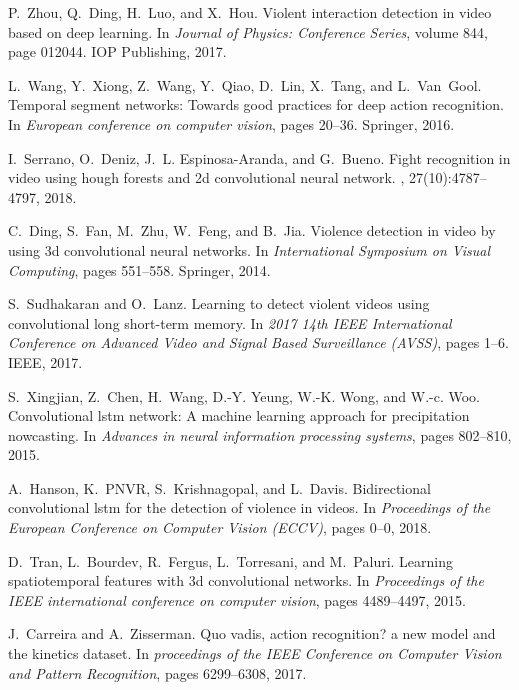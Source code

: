 \documentclass[10pt,twocolumn,letterpaper]{article}
\begin{document}
{\begin{thebibliography}{10}
P.~Zhou, Q.~Ding, H.~Luo, and X.~Hou.
\newblock Violent interaction detection in video based on deep learning.
\newblock In {\em Journal of Physics: Conference Series}, volume 844, page
	012044. IOP Publishing, 2017.

L.~Wang, Y.~Xiong, Z.~Wang, Y.~Qiao, D.~Lin, X.~Tang, and L.~Van~Gool.
\newblock Temporal segment networks: Towards good practices for deep action
	recognition.
\newblock In {\em European conference on computer vision}, pages 20--36.
	Springer, 2016.

I.~Serrano, O.~Deniz, J.~L. Espinosa-Aranda, and G.~Bueno.
\newblock Fight recognition in video using hough forests and 2d convolutional
	neural network.
, 27(10):4787--4797, 2018.

C.~Ding, S.~Fan, M.~Zhu, W.~Feng, and B.~Jia.
\newblock Violence detection in video by using 3d convolutional neural
	networks.
\newblock In {\em International Symposium on Visual Computing}, pages 551--558.
	Springer, 2014.

S.~Sudhakaran and O.~Lanz.
\newblock Learning to detect violent videos using convolutional long short-term
	memory.
\newblock In {\em 2017 14th IEEE International Conference on Advanced Video and
	Signal Based Surveillance (AVSS)}, pages 1--6. IEEE, 2017.

S.~Xingjian, Z.~Chen, H.~Wang, D.-Y. Yeung, W.-K. Wong, and W.-c. Woo.
\newblock Convolutional lstm network: A machine learning approach for
	precipitation nowcasting.
\newblock In {\em Advances in neural information processing systems}, pages
	802--810, 2015.

A.~Hanson, K.~PNVR, S.~Krishnagopal, and L.~Davis.
\newblock Bidirectional convolutional lstm for the detection of violence in
	videos.
\newblock In {\em Proceedings of the European Conference on Computer Vision
	(ECCV)}, pages 0--0, 2018.

D.~Tran, L.~Bourdev, R.~Fergus, L.~Torresani, and M.~Paluri.
\newblock Learning spatiotemporal features with 3d convolutional networks.
\newblock In {\em Proceedings of the IEEE international conference on computer
	vision}, pages 4489--4497, 2015.

J.~Carreira and A.~Zisserman.
\newblock Quo vadis, action recognition? a new model and the kinetics dataset.
\newblock In {\em proceedings of the IEEE Conference on Computer Vision and
	Pattern Recognition}, pages 6299--6308, 2017.


\end{thebibliography}}
\end{document}
